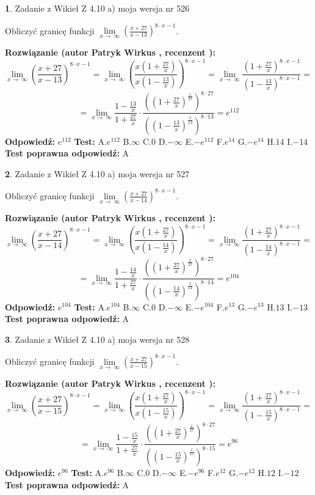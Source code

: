 \documentclass[12pt, a4paper]{article}
\theoremstyle{definition} %
\newtheorem{zad}{}
\newcommand{\zadStart}[1]{\begin{zad}#1\newline}
\newcommand{\zadStop}{\end{zad}}
\newcommand{\rozwStart}[2]{\noindent \textbf{Rozwiązanie (autor #1 , recenzent #2): }\newline}
\newcommand{\rozwStop}{\newline}
\newcommand{\odpStart}{\noindent \textbf{Odpowiedź:}\newline}
\newcommand{\odpStop}{\newline}
\newcommand{\testStart}{\noindent \textbf{Test:}\newline}
\newcommand{\testStop}{\newline}
\newcommand{\kluczStart}{\noindent \textbf{Test poprawna odpowiedź:}\newline}
\newcommand{\kluczStop}{\newline}
\begin{document}
\zadStart{Zadanie z Wikieł Z 4.10 a) moja wersja nr 526}

Obliczyć granicę funkcji  $\lim\limits_{x\to\ \infty}(\frac{x+27}{x-13})^{8\cdot x-1}$.
\zadStop
\rozwStart{Patryk Wirkus}{}
$$\lim\limits_{x\to\ \infty}(\frac{x+27}{x-13})^{8\cdot x-1} = \lim\limits_{x\to\ \infty}(\frac{x(1+\frac{27}{x})}{x(1-\frac{13}{x})})^{8\cdot x-1}=\lim\limits_{x\to\ \infty}\frac{(1+\frac{27}{x})^{8\cdot x-1}}{(1-\frac{13}{x})^{8\cdot x-1}}=$$
$$=\lim\limits_{x\to\ \infty}\frac{1-\frac{13}{x}}{1+\frac{27}{x}}\cdot\frac{((1+\frac{27}{x})^{\frac{x}{27}})^{8\cdot27}}{((1-\frac{13}{x})^{\frac{x}{13}})^{8\cdot13}}=e^{112}$$
\rozwStop
\odpStart
$e^{112}$
\odpStop
\testStart
A.$e^{112}$ B.$\infty$ C.$0$ D.$-\infty$ E.$-e^{112}$
F.$e^{14}$ G.$-e^{14}$
H.$14$
I.$-14$
\testStop
\kluczStart
A
\kluczStop



\zadStart{Zadanie z Wikieł Z 4.10 a) moja wersja nr 527}

Obliczyć granicę funkcji  $\lim\limits_{x\to\ \infty}(\frac{x+27}{x-14})^{8\cdot x-1}$.
\zadStop
\rozwStart{Patryk Wirkus}{}
$$\lim\limits_{x\to\ \infty}(\frac{x+27}{x-14})^{8\cdot x-1} = \lim\limits_{x\to\ \infty}(\frac{x(1+\frac{27}{x})}{x(1-\frac{14}{x})})^{8\cdot x-1}=\lim\limits_{x\to\ \infty}\frac{(1+\frac{27}{x})^{8\cdot x-1}}{(1-\frac{14}{x})^{8\cdot x-1}}=$$
$$=\lim\limits_{x\to\ \infty}\frac{1-\frac{14}{x}}{1+\frac{27}{x}}\cdot\frac{((1+\frac{27}{x})^{\frac{x}{27}})^{8\cdot27}}{((1-\frac{14}{x})^{\frac{x}{14}})^{8\cdot14}}=e^{104}$$
\rozwStop
\odpStart
$e^{104}$
\odpStop
\testStart
A.$e^{104}$ B.$\infty$ C.$0$ D.$-\infty$ E.$-e^{104}$
F.$e^{13}$ G.$-e^{13}$
H.$13$
I.$-13$
\testStop
\kluczStart
A
\kluczStop



\zadStart{Zadanie z Wikieł Z 4.10 a) moja wersja nr 528}

Obliczyć granicę funkcji  $\lim\limits_{x\to\ \infty}(\frac{x+27}{x-15})^{8\cdot x-1}$.
\zadStop
\rozwStart{Patryk Wirkus}{}
$$\lim\limits_{x\to\ \infty}(\frac{x+27}{x-15})^{8\cdot x-1} = \lim\limits_{x\to\ \infty}(\frac{x(1+\frac{27}{x})}{x(1-\frac{15}{x})})^{8\cdot x-1}=\lim\limits_{x\to\ \infty}\frac{(1+\frac{27}{x})^{8\cdot x-1}}{(1-\frac{15}{x})^{8\cdot x-1}}=$$
$$=\lim\limits_{x\to\ \infty}\frac{1-\frac{15}{x}}{1+\frac{27}{x}}\cdot\frac{((1+\frac{27}{x})^{\frac{x}{27}})^{8\cdot27}}{((1-\frac{15}{x})^{\frac{x}{15}})^{8\cdot15}}=e^{96}$$
\rozwStop
\odpStart
$e^{96}$
\odpStop
\testStart
A.$e^{96}$ B.$\infty$ C.$0$ D.$-\infty$ E.$-e^{96}$
F.$e^{12}$ G.$-e^{12}$
H.$12$
I.$-12$
\testStop
\kluczStart
A
\kluczStop
\end{document}
